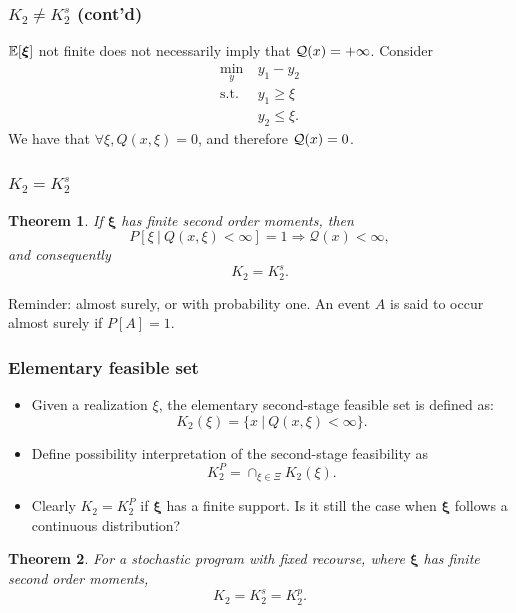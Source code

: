 \documentclass{beamer}
\newtheorem{theo}{Theorem}
\def\bxi{\boldsymbol\xi}
\def\bxi{\boldsymbol\xi}
\begin{document}
\begin{frame}
\frametitle{$K_2 \ne K_2^s$ (cont'd)}

$\EE[\bxi]$ not finite does not necessarily imply that ${\mathcal{Q}}(x) = +\infty$. Consider
\begin{align*}
\min_y \ & y_1 - y_2 \\
\text{s.t. } & y_1 \geq \xi \\
& y_2 \leq \xi.
\end{align*}
We have that $\forall \xi, Q(x, \xi) = 0$, and therefore ${\mathcal{Q}}(x) = 0$.

\end{frame}

\begin{frame}
\frametitle{$K_2 = K_2^s$}

\begin{theo}
If $\bxi$ has finite second order moments, then
$$
P[ \xi \ |\ Q(x,\xi) < \infty] = 1 \Longrightarrow \mathcal{Q}(x) < \infty,
$$
and consequently
$$
K_2 = K_2^s.
$$
\end{theo}


\mbox{}

Reminder: almost surely, or with probability one. An event $A$ is said to occur almost surely if $P[A] = 1$.

\end{frame}

\begin{frame}
\frametitle{Elementary feasible set}

\begin{itemize}
	\item 
Given a realization $\xi$, the {\red elementary second-stage feasible set} is defined as:
\[
K_2(\xi) = \lbrace x \ |\ Q(x,\xi) < \infty \rbrace.
\]
\item
Define {\red possibility interpretation} of the second-stage feasibility as
\[
K_2^P = \cap_{\xi \in \Xi} K_2(\xi).
\]
\item
Clearly $K_2 = K_2^P$ if $\bxi$ has a finite support.
Is it still the case when $\bxi$ follows a continuous distribution?
\end{itemize}

\begin{theo}
For a stochastic program with fixed recourse, where $\bxi$ has finite second order moments,
$$K_2 = K_2^s = K_2^p.$$
\end{theo}

\end{frame}
\end{document}
